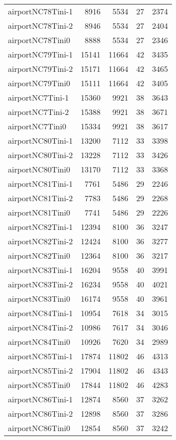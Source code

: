 \begin{tabular}{lrrrr}
airportNC78Tini-1 & 8916 & 5534 & 27 & 2374 \\
airportNC78Tini-2 & 8946 & 5534 & 27 & 2404 \\
airportNC78Tini0 & 8888 & 5534 & 27 & 2346 \\
airportNC79Tini-1 & 15141 & 11664 & 42 & 3435 \\
airportNC79Tini-2 & 15171 & 11664 & 42 & 3465 \\
airportNC79Tini0 & 15111 & 11664 & 42 & 3405 \\
airportNC7Tini-1 & 15360 & 9921 & 38 & 3643 \\
airportNC7Tini-2 & 15388 & 9921 & 38 & 3671 \\
airportNC7Tini0 & 15334 & 9921 & 38 & 3617 \\
airportNC80Tini-1 & 13200 & 7112 & 33 & 3398 \\
airportNC80Tini-2 & 13228 & 7112 & 33 & 3426 \\
airportNC80Tini0 & 13170 & 7112 & 33 & 3368 \\
airportNC81Tini-1 & 7761 & 5486 & 29 & 2246 \\
airportNC81Tini-2 & 7783 & 5486 & 29 & 2268 \\
airportNC81Tini0 & 7741 & 5486 & 29 & 2226 \\
airportNC82Tini-1 & 12394 & 8100 & 36 & 3247 \\
airportNC82Tini-2 & 12424 & 8100 & 36 & 3277 \\
airportNC82Tini0 & 12364 & 8100 & 36 & 3217 \\
airportNC83Tini-1 & 16204 & 9558 & 40 & 3991 \\
airportNC83Tini-2 & 16234 & 9558 & 40 & 4021 \\
airportNC83Tini0 & 16174 & 9558 & 40 & 3961 \\
airportNC84Tini-1 & 10954 & 7618 & 34 & 3015 \\
airportNC84Tini-2 & 10986 & 7617 & 34 & 3046 \\
airportNC84Tini0 & 10926 & 7620 & 34 & 2989 \\
airportNC85Tini-1 & 17874 & 11802 & 46 & 4313 \\
airportNC85Tini-2 & 17904 & 11802 & 46 & 4343 \\
airportNC85Tini0 & 17844 & 11802 & 46 & 4283 \\
airportNC86Tini-1 & 12874 & 8560 & 37 & 3262 \\
airportNC86Tini-2 & 12898 & 8560 & 37 & 3286 \\
airportNC86Tini0 & 12854 & 8560 & 37 & 3242 \\

\end{tabular}
